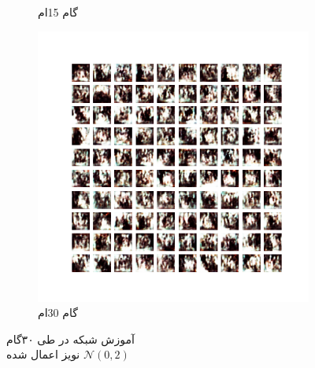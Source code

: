 \documentclass[12pt, a4paper]{book}
\begin{document}
\begin{figure}[h]
\begin{subfigure}{0.3\linewidth}
        \caption{گام 15ام}
    \end{subfigure}
    \begin{subfigure}{0.3\linewidth}
        \includegraphics[width=\linewidth]{images/dcgan/noisy_std2.0/generated_img_30.png}
        \caption{گام 30ام}
    \end{subfigure}
    \caption{آموزش شبکه  در طی ۳۰گام\\ نویز اعمال شده $\mathcal{N}(0,2)$}
    \label{dcgan_noisy_std2.0}
\end{figure}
\end{document}
